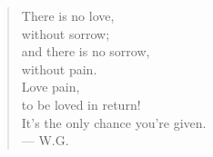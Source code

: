 \begin{quote}
There is no love, \\
without sorrow; \\
and there is no sorrow, \\
without pain. \\
Love pain, \\
to be loved in return! \\
It's the only chance you're given. \\
--- W.G.
\end{quote}

